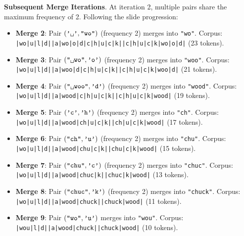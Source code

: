 \documentclass[../../../main.tex]{subfiles}
\begin{document}
\noindent\textbf{Subsequent Merge Iterations}.\newline
At iteration 2, multiple pairs share the maximum frequency of 2. Following the slide progression:
\begin{itemize}
    \item \textbf{Merge 2}: Pair $(\text{\texttt{'\textvisiblespace{}'}}, \text{\texttt{"wo"}})$ (frequency 2) merges into \texttt{"\textvisiblespace{}wo"}.
    Corpus: \texttt{|wo|u|l|d|\textvisiblespace{}|a|\textvisiblespace{}wo|o|d|c|h|u|c|k|\textvisiblespace{}|c|h|u|c|k|\textvisiblespace{}wo|o|d|} (23 tokens).
    \item \textbf{Merge 3}: Pair $(\text{\texttt{"\textvisiblespace{}wo"}}, \text{\texttt{'o'}})$ (frequency 2) merges into \texttt{"\textvisiblespace{}woo"}.
    Corpus: \texttt{|wo|u|l|d|\textvisiblespace{}|a|\textvisiblespace{}woo|d|c|h|u|c|k|\textvisiblespace{}|c|h|u|c|k|\textvisiblespace{}woo|d|} (21 tokens).
    \item \textbf{Merge 4}: Pair $(\text{\texttt{"\textvisiblespace{}woo"}}, \text{\texttt{'d'}})$ (frequency 2) merges into \texttt{"\textvisiblespace{}wood"}.
    Corpus: \texttt{|wo|u|l|d|\textvisiblespace{}|a|\textvisiblespace{}wood|c|h|u|c|k|\textvisiblespace{}|c|h|u|c|k|\textvisiblespace{}wood|} (19 tokens).
    \item \textbf{Merge 5}: Pair $(\text{\texttt{'c'}}, \text{\texttt{'h'}})$ (frequency 2) merges into \texttt{"ch"}.
    Corpus: \texttt{|wo|u|l|d|\textvisiblespace{}|a|\textvisiblespace{}wood|ch|u|c|k|\textvisiblespace{}|ch|u|c|k|\textvisiblespace{}wood|} (17 tokens).
    \item \textbf{Merge 6}: Pair $(\text{\texttt{"ch"}}, \text{\texttt{'u'}})$ (frequency 2) merges into \texttt{"chu"}.
    Corpus: \texttt{|wo|u|l|d|\textvisiblespace{}|a|\textvisiblespace{}wood|chu|c|k|\textvisiblespace{}|chu|c|k|\textvisiblespace{}wood|} (15 tokens).
    \item \textbf{Merge 7}: Pair $(\text{\texttt{"chu"}}, \text{\texttt{'c'}})$ (frequency 2) merges into \texttt{"chuc"}.
    Corpus: \texttt{|wo|u|l|d|\textvisiblespace{}|a|\textvisiblespace{}wood|chuc|k|\textvisiblespace{}|chuc|k|\textvisiblespace{}wood|} (13 tokens).
    \item \textbf{Merge 8}: Pair $(\text{\texttt{"chuc"}}, \text{\texttt{'k'}})$ (frequency 2) merges into \texttt{"chuck"}.
    Corpus: \texttt{|wo|u|l|d|\textvisiblespace{}|a|\textvisiblespace{}wood|chuck|\textvisiblespace{}|chuck|\textvisiblespace{}wood|} (11 tokens).
    \item \textbf{Merge 9}: Pair $(\text{\texttt{"wo"}}, \text{\texttt{'u'}})$ merges into \texttt{"wou"}.
    Corpus: \texttt{|wou|l|d|\textvisiblespace{}|a|\textvisiblespace{}wood|chuck|\textvisiblespace{}|chuck|\textvisiblespace{}wood|} (10 tokens).
\end{itemize}
\end{document}
